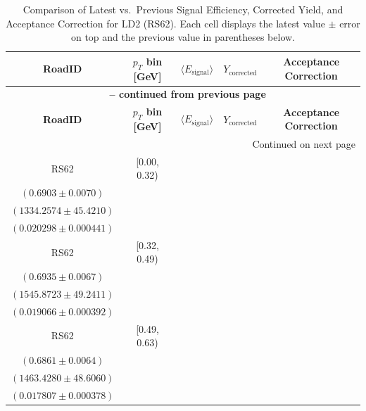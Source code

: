 {\footnotesize
\renewcommand{\arraystretch}{1.35}
\begin{longtable}{|c|c|c|c|c|}
\caption{Comparison of Latest vs.\ Previous Signal Efficiency, Corrected Yield, and Acceptance Correction for LD2 (RS62). Each cell displays the latest value $\pm$ error on top and the previous value in parentheses below.} \label{tab:eff_acc_comp_LD2_RS62} \\
\hline
\textbf{RoadID} & \textbf{$p_{T}$ bin [GeV]} & \textbf{$\langle E_{\mathrm{signal}} \rangle$} & \textbf{$Y_{\mathrm{corrected}}$} & \textbf{Acceptance Correction} \\
\hline
\endfirsthead
\multicolumn{5}{c}{{\bfseries \tablename\ \thetable{} -- continued from previous page}} \\
\hline
\textbf{RoadID} & \textbf{$p_{T}$ bin [GeV]} & \textbf{$\langle E_{\mathrm{signal}} \rangle$} & \textbf{$Y_{\mathrm{corrected}}$} & \textbf{Acceptance Correction} \\
\hline
\endhead
\hline \multicolumn{5}{|r|}{{Continued on next page}} \\ \hline
\endfoot
\hline
\endlastfoot
RS62 & [0.00, 0.32) & \begin{tabular}{@{}c@{}}$0.7264 \pm 0.0056$ \\ $(0.6903 \pm 0.0070)$\end{tabular} & \begin{tabular}{@{}c@{}}$1266.5575 \pm 43.1852$ \\ $(1334.2574 \pm 45.4210)$\end{tabular} & \begin{tabular}{@{}c@{}}$0.017935 \pm 0.000555$ \\ $(0.020298 \pm 0.000441)$\end{tabular} \\ \hline
RS62 & [0.32, 0.49) & \begin{tabular}{@{}c@{}}$0.7198 \pm 0.0058$ \\ $(0.6935 \pm 0.0067)$\end{tabular} & \begin{tabular}{@{}c@{}}$1489.3426 \pm 47.4405$ \\ $(1545.8723 \pm 49.2411)$\end{tabular} & \begin{tabular}{@{}c@{}}$0.017707 \pm 0.000501$ \\ $(0.019066 \pm 0.000392)$\end{tabular} \\ \hline
RS62 & [0.49, 0.63) & \begin{tabular}{@{}c@{}}$0.7061 \pm 0.0059$ \\ $(0.6861 \pm 0.0064)$\end{tabular} & \begin{tabular}{@{}c@{}}$1421.9329 \pm 47.2278$ \\ $(1463.4280 \pm 48.6060)$\end{tabular} & \begin{tabular}{@{}c@{}}$0.016331 \pm 0.000480$ \\ $(0.017807 \pm 0.000378)$\end{tabular} \\ \hline

\end{longtable}}

